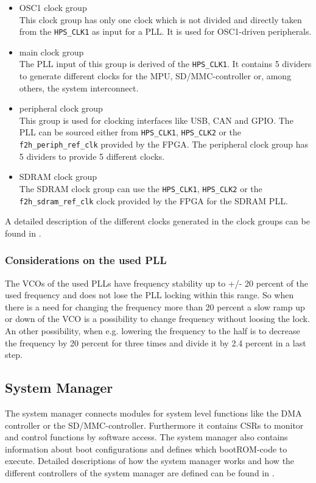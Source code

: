 \begin{itemize}
\item OSC1 clock group\\
This clock group has only one clock which is not divided and directly taken from the \texttt{HPS\_CLK1} as input for a PLL. It is used for OSC1-driven peripherals.
\item main clock group\\
The PLL input of this group is derived of the \texttt{HPS\_CLK1}. It contains 5 dividers to generate different clocks for the MPU, SD/MMC-controller or, among others, the system interconnect.
\item peripheral clock group\\
This group is used for clocking interfaces like USB, CAN and GPIO. The PLL can be sourced either from \texttt{HPS\_CLK1}, \texttt{HPS\_CLK2} or the \texttt{f2h\_periph\_ref\_clk} provided by the FPGA. The peripheral clock group has 5 dividers to provide 5 different clocks.
\item SDRAM clock group\\
The SDRAM clock group can use the  \texttt{HPS\_CLK1}, \texttt{HPS\_CLK2} or the \texttt{f2h\_sdram\_ref\_clk} clock provided by the FPGA for the SDRAM PLL.
\end{itemize}
A detailed description of the different clocks generated in the clock groups can be found in \cite[chapter 2]{AlteraHPS15}.
\subsubsection{Considerations on the used PLL}
The VCOs of the used PLLs have frequency stability up to +/- 20 percent of the used frequency and does not lose the PLL locking within this range. So when there is a need for changing the frequency more than 20 percent a slow ramp up or down of the VCO is a possibility to change frequency without loosing the lock. An other possibility, when e.g. lowering the frequency to the half is to decrease the frequency by 20 percent for three times and divide it by 2.4 percent in a last step.
\subsection{System Manager}
The system manager connects modules for system level functions like the DMA controller or the SD/MMC-controller. Furthermore it contains CSRs to monitor and control functions by software access. The system manager also contains information about boot configurations and defines which bootROM-code to execute. Detailed descriptions of how the system manager works and how the different controllers of the system manager are defined can be found in \cite[chapter 5]{AlteraHPS15}.
